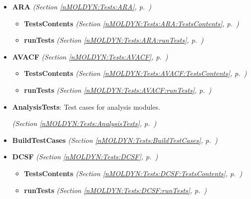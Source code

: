 \begin{itemize}
\setlength{\parskip}{0ex}
\item \textbf{ARA}
  \textit{(Section \ref{nMOLDYN:Tests:ARA}, p.~\pageref{nMOLDYN:Tests:ARA})}

  \begin{itemize}
\setlength{\parskip}{0ex}
    \item \textbf{TestsContents}
  \textit{(Section \ref{nMOLDYN:Tests:ARA:TestsContents}, p.~\pageref{nMOLDYN:Tests:ARA:TestsContents})}

    \item \textbf{runTests}
  \textit{(Section \ref{nMOLDYN:Tests:ARA:runTests}, p.~\pageref{nMOLDYN:Tests:ARA:runTests})}

  \end{itemize}
\item \textbf{AVACF}
  \textit{(Section \ref{nMOLDYN:Tests:AVACF}, p.~\pageref{nMOLDYN:Tests:AVACF})}

  \begin{itemize}
\setlength{\parskip}{0ex}
    \item \textbf{TestsContents}
  \textit{(Section \ref{nMOLDYN:Tests:AVACF:TestsContents}, p.~\pageref{nMOLDYN:Tests:AVACF:TestsContents})}

    \item \textbf{runTests}
  \textit{(Section \ref{nMOLDYN:Tests:AVACF:runTests}, p.~\pageref{nMOLDYN:Tests:AVACF:runTests})}

  \end{itemize}
\item \textbf{AnalysisTests}: Test cases for analysis modules.



  \textit{(Section \ref{nMOLDYN:Tests:AnalysisTests}, p.~\pageref{nMOLDYN:Tests:AnalysisTests})}

\item \textbf{BuildTestCases}
  \textit{(Section \ref{nMOLDYN:Tests:BuildTestCases}, p.~\pageref{nMOLDYN:Tests:BuildTestCases})}

\item \textbf{DCSF}
  \textit{(Section \ref{nMOLDYN:Tests:DCSF}, p.~\pageref{nMOLDYN:Tests:DCSF})}

  \begin{itemize}
\setlength{\parskip}{0ex}
    \item \textbf{TestsContents}
  \textit{(Section \ref{nMOLDYN:Tests:DCSF:TestsContents}, p.~\pageref{nMOLDYN:Tests:DCSF:TestsContents})}

    \item \textbf{runTests}
  \textit{(Section \ref{nMOLDYN:Tests:DCSF:runTests}, p.~\pageref{nMOLDYN:Tests:DCSF:runTests})}


\end{itemize}
\end{itemize}
